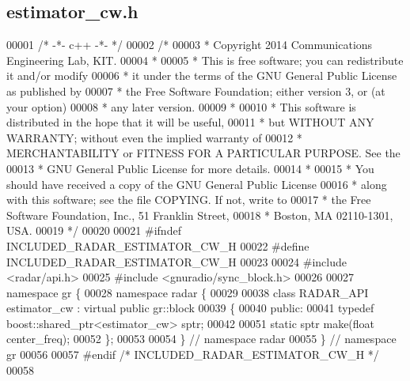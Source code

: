 \subsection{estimator\+\_\+cw.\+h}
\label{estimator__cw_8h_source}

\begin{DoxyCode}
00001 \textcolor{comment}{/* -*- c++ -*- */}
00002 \textcolor{comment}{/* }
00003 \textcolor{comment}{ * Copyright 2014 Communications Engineering Lab, KIT.}
00004 \textcolor{comment}{ * }
00005 \textcolor{comment}{ * This is free software; you can redistribute it and/or modify}
00006 \textcolor{comment}{ * it under the terms of the GNU General Public License as published by}
00007 \textcolor{comment}{ * the Free Software Foundation; either version 3, or (at your option)}
00008 \textcolor{comment}{ * any later version.}
00009 \textcolor{comment}{ * }
00010 \textcolor{comment}{ * This software is distributed in the hope that it will be useful,}
00011 \textcolor{comment}{ * but WITHOUT ANY WARRANTY; without even the implied warranty of}
00012 \textcolor{comment}{ * MERCHANTABILITY or FITNESS FOR A PARTICULAR PURPOSE.  See the}
00013 \textcolor{comment}{ * GNU General Public License for more details.}
00014 \textcolor{comment}{ * }
00015 \textcolor{comment}{ * You should have received a copy of the GNU General Public License}
00016 \textcolor{comment}{ * along with this software; see the file COPYING.  If not, write to}
00017 \textcolor{comment}{ * the Free Software Foundation, Inc., 51 Franklin Street,}
00018 \textcolor{comment}{ * Boston, MA 02110-1301, USA.}
00019 \textcolor{comment}{ */}
00020  
00021 \textcolor{preprocessor}{#ifndef INCLUDED\_RADAR\_ESTIMATOR\_CW\_H}
00022 \textcolor{preprocessor}{#define INCLUDED\_RADAR\_ESTIMATOR\_CW\_H}
00023 
00024 \textcolor{preprocessor}{#include <radar/api.h>}
00025 \textcolor{preprocessor}{#include <gnuradio/sync\_block.h>}
00026 
00027 \textcolor{keyword}{namespace }gr \{
00028   \textcolor{keyword}{namespace }radar \{
00029 
00038     \textcolor{keyword}{class }RADAR_API estimator_cw : \textcolor{keyword}{virtual} \textcolor{keyword}{public} gr::block
00039     \{
00040      \textcolor{keyword}{public}:
00041       \textcolor{keyword}{typedef} boost::shared\_ptr<estimator\_cw> sptr;
00042 
00051       \textcolor{keyword}{static} sptr make(\textcolor{keywordtype}{float} center_freq);
00052     \};
00053 
00054   \} \textcolor{comment}{// namespace radar}
00055 \} \textcolor{comment}{// namespace gr}
00056 
00057 \textcolor{preprocessor}{#endif }\textcolor{comment}{/* INCLUDED\_RADAR\_ESTIMATOR\_CW\_H */}\textcolor{preprocessor}{}
00058 
\end{DoxyCode}
